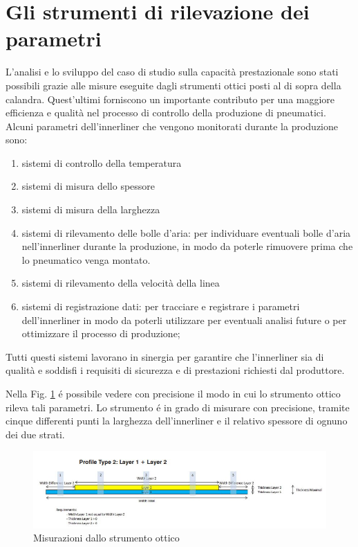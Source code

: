 \label{Gli strumenti di rilevazione dei parametri}
\section{Gli strumenti di rilevazione dei parametri}
L'analisi e lo sviluppo del caso di studio sulla capacità prestazionale sono stati possibili grazie alle misure eseguite dagli strumenti ottici posti al di sopra della calandra.
Quest'ultimi forniscono un importante contributo per una maggiore efficienza e qualità nel processo di controllo della produzione di pneumatici.
Alcuni parametri dell'innerliner che vengono monitorati durante la produzione sono:

\begin{enumerate}
\item sistemi di controllo della temperatura
\item sistemi di misura dello spessore
\item sistemi di misura della larghezza
\item sistemi di rilevamento delle bolle d'aria: per individuare eventuali bolle d'aria nell'innerliner durante la produzione, in modo da poterle rimuovere prima che lo pneumatico venga montato.
\item sistemi di rilevamento della velocità della linea
\item sistemi di registrazione dati: per tracciare e registrare i parametri dell'innerliner in modo da poterli utilizzare per eventuali analisi future o per ottimizzare il processo di produzione;
\end{enumerate}

Tutti questi sistemi lavorano in sinergia per garantire che l'innerliner sia di qualità e soddisfi i requisiti di sicurezza e di prestazioni richiesti dal produttore.

Nella Fig. \ref{fig:profilometro.jpg} é possibile vedere con precisione il modo in cui lo strumento ottico rileva tali parametri.
Lo strumento é in grado di misurare con precisione, tramite cinque differenti punti la larghezza dell'innerliner e il relativo spessore di ognuno dei due strati.


\begin{figure}[h]
  \centering
  \includegraphics[width=1\textwidth]{img/profilometro.png}
  \caption{Misurazioni dallo strumento ottico}
  \label{fig:profilometro.jpg}
\end{figure}


